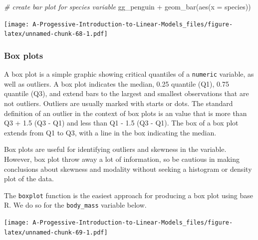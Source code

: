 \documentclass[
]{book}
\newenvironment{Shaded}{\begin{snugshade}}{\end{snugshade}}
\newcommand{\AttributeTok}[1]{\textcolor[rgb]{0.77,0.63,0.00}{#1}}
\newcommand{\CommentTok}[1]{\textcolor[rgb]{0.56,0.35,0.01}{\textit{#1}}}
\newcommand{\FunctionTok}[1]{\textcolor[rgb]{0.00,0.00,0.00}{#1}}
\newcommand{\NormalTok}[1]{#1}
\newcommand{\SpecialCharTok}[1]{\textcolor[rgb]{0.00,0.00,0.00}{#1}}
\newcommand{\StringTok}[1]{\textcolor[rgb]{0.31,0.60,0.02}{#1}}
\theoremstyle{definition}
\theoremstyle{definition}
\theoremstyle{definition}
\theoremstyle{definition}
\theoremstyle{remark}
\begin{document}
\begin{Shaded}
\begin{Highlighting}[]
\CommentTok{\# create bar plot for species variable}
\NormalTok{gg\_penguin }\SpecialCharTok{+} \FunctionTok{geom\_bar}\NormalTok{(}\FunctionTok{aes}\NormalTok{(}\AttributeTok{x =}\NormalTok{ species))}
\end{Highlighting}
\end{Shaded}

\texttt{[image: A-Progessive-Introduction-to-Linear-Models\_files/figure-latex/unnamed-chunk-68-1.pdf]}

\hypertarget{box-plots}{%
\subsubsection{Box plots}\label{box-plots}}

A box plot is a simple graphic showing critical quantiles of a \texttt{numeric} variable, as well as outliers. A box plot indicates the median, 0.25 quantile (Q1), 0.75 quantile (Q3), and extend bars to the largest and smallest observations that are not outliers. Outliers are usually marked with starts or dots. The standard definition of an outlier in the context of box plots is an value that is more than Q3 + 1.5 (Q3 - Q1) and less than Q1 - 1.5 (Q3 - Q1). The box of a box plot extends from Q1 to Q3, with a line in the box indicating the median.

Box plots are useful for identifying outliers and skewness in the variable. However, box plot throw away a lot of information, so be cautious in making conclusions about skewness and modality without seeking a histogram or density plot of the data.

The \texttt{boxplot} function is the easiest approach for producing a box plot using base R. We do so for the \texttt{body\_mass} variable below.

\begin{Shaded}
\end{Shaded}

\texttt{[image: A-Progessive-Introduction-to-Linear-Models\_files/figure-latex/unnamed-chunk-69-1.pdf]}
\end{document}
